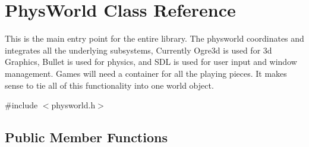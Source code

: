 \hypertarget{classPhysWorld}{
\section{PhysWorld Class Reference}
\label{db/df5/classPhysWorld}
}


This is the main entry point for the entire library. The physworld coordinates and integrates all the underlying subsystems, Currently Ogre3d is used for 3d Graphics, Bullet is used for physics, and SDL is used for user input and window management. Games will need a container for all the playing pieces. It makes sense to tie all of this functionality into one world object.  


{\ttfamily \#include $<$physworld.h$>$}\subsection*{Public Member Functions}
